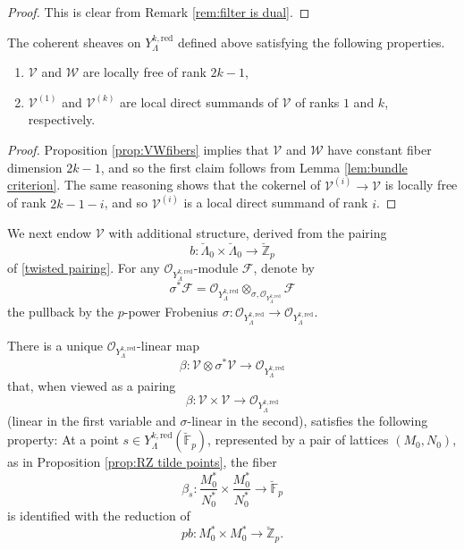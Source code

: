 \documentclass[11pt]{alggeom}
\newcommand{\red}{\mathrm{red}}
\newcommand{\Z}{\mathbb Z}
\newcommand{\F}{\mathbb F}
\newcommand{\co}{\mathcal O}
\begin{document}
 \begin{proof}
 This is clear from Remark  \ref{rem:filter is dual}.
 \end{proof}
 
 \begin{corollary}
 The coherent sheaves on $Y_\Lambda^{k,\red}$ defined above satisfying the following properties.
 \begin{enumerate}
 \item
 $\mathscr{V}$ and $\mathscr{W}$ are locally free of rank $2k-1$,
 \item
 $\mathscr{V}^{(1)}$ and $\mathscr{V}^{(k)}$ are local direct summands of $\mathscr{V}$ of ranks $1$ and $k$, respectively.
 \end{enumerate}
 \end{corollary}
 
 \begin{proof}
 Proposition \ref{prop:VWfibers} implies that $\mathscr{V}$ and $\mathscr{W}$ have constant fiber dimension $2k-1$, 
 and so the first claim follows from Lemma \ref{lem:bundle criterion}.
 The same reasoning shows  that the cokernel of $\mathscr{V}^{(i)} \to \mathscr{V}$ is locally free of rank $2k-1-i$, and so $\mathscr{V}^{(i)}$ is a local direct summand of rank $i$.
\end{proof}



We next endow  $\mathscr{V}$ with additional structure, derived from the pairing 
\[
b   : \breve{\Lambda}_0  \times \breve{\Lambda}_0 \to \breve{\Z}_p
\]
of \eqref{twisted pairing}.
 For any $\co_{Y^{k,\red}_\Lambda}$-module $\mathscr{F}$, denote by 
\begin{equation}\label{coherent frob twist}
\sigma^* \mathscr{F} = \co_{Y^{k,\red}_\Lambda} \otimes_{\sigma, \co_{Y^{k,\red}_\Lambda}} \mathscr{F}
\end{equation}
the pullback by the  $p$-power Frobenius  $\sigma:\co_{Y^{k,\red}_\Lambda} \to \co_{Y^{k,\red}_\Lambda}$.

\begin{proposition}\label{prop:beta def}
There is a  unique  $\co_{Y_\Lambda^{k,\red}}$-linear map
\[
\beta : \mathscr{V} \otimes \sigma^*\mathscr{V} \to \co_{Y_\Lambda^{k,\red}}
\]
that, when viewed as a pairing 
\[
\beta : \mathscr{V} \times \mathscr{V} \to \co_{Y_\Lambda^{k,\red}}
\]
(linear in the first variable and $\sigma$-linear in the second),  satisfies the following property:
At a point $s \in Y_\Lambda^{k,\red}(\breve{\F}_p)$,  represented by a pair of lattices $(M_0,N_0)$, 
 as in Proposition \ref{prop:RZ tilde points}, the fiber 
\[
\beta_s : \frac{M_0^*}{N_0^*} \times \frac{M_0^*}{N_0^*} \to \breve{\F}_p
\]
is identified with the reduction  of 
\[
pb : M_0^* \times M_0^* \to  \breve{\Z}_p .
\]
\end{proposition}
\end{document}
